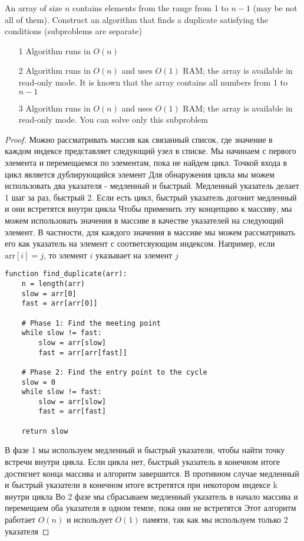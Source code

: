 \begin{prob}
An array of size $n$ contains elements from the range from 1 to $n-1$ (may be not all of them). Construct an algorithm that finds a duplicate satisfying the conditions (subproblems are separate)
\begin{itemize}
\item[]
\item[1] Algorithm runs in $O(n)$
\item[2] Algorithm runs in $O(n)$ and uses $O(1)$ RAM; the array is available in read-only mode. It is known that the array contains all numbers from 1 to $n-1$
\item[3] Algorithm runs in $O(n)$ and uses $O(1)$ RAM; the array is available in read-only mode. You can solve only this subproblem
\end{itemize}
\end{prob}
\vskip 0.2in
\begin{proof}
Можно рассматривать массив как связанный список, где значение в каждом индексе представляет следующий узел в списке. Мы начинаем с первого элемента и перемещаемся по элементам, пока не найдем цикл. Точкой входа в цикл является дублирующийся элемент
\vskip 0.1in
Для обнаружения цикла мы можем использовать два указателя - медленный и быстрый. Медленный указатель делает 1 шаг за раз, быстрый 2. Если есть цикл, быстрый указатель догонит медленный и они встретятся внутри цикла
\vskip 0.1in
Чтобы применить эту концепцию к массиву, мы можем использовать значения в массиве в качестве указателей на следующий элемент. В частности, для каждого значения в массиве мы можем рассматривать его как указатель на элемент с соответсвующим индексом. Например, если $\text{arr}[i] = j$, то элемент $i$ указывает на элемент $j$

\begin{lstlisting}
function find_duplicate(arr):
    n = length(arr)
    slow = arr[0]
    fast = arr[arr[0]]

    # Phase 1: Find the meeting point
    while slow != fast:
        slow = arr[slow]
        fast = arr[arr[fast]]

    # Phase 2: Find the entry point to the cycle
    slow = 0
    while slow != fast:
        slow = arr[slow]
        fast = arr[fast]

    return slow
\end{lstlisting}

В фазе 1 мы используем медленный и быстрый указатели, чтобы найти точку встречи внутри цикла. Если цикла нет, быстрый указатель в конечном итоге достигнет конца массива и алгоритм завершится. В противном случае медленный и быстрый указатели в конечном итоге встретятся при некотором индексе k внутри цикла
\vskip 0.1in
Во 2 фазе мы сбрасываем медленный указатель в начало массива и перемещаем оба указателя в одном темпе, пока они не встретятся
\vskip 0.1in
Этот алгоритм работает $O(n)$ и использует $O(1)$ памяти, так как мы используем только 2 указателя
\end{proof}